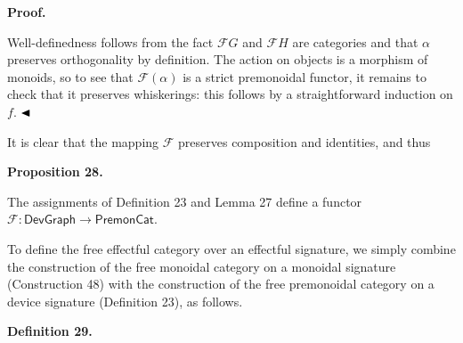\documentclass[10pt,a4paper]{article}
\begin{document}
 
\par\medskip\noindent\textbf{Proof.}\par
 
 
Well-definedness follows from the fact $\mathcal{F}G$ and $\mathcal{F}H$ are categories and that $\alpha$ preserves orthogonality by definition. The action on objects is a morphism of monoids, so to see that $\mathcal{F}(\alpha)$ is a strict premonoidal functor, it remains to check that it preserves whiskerings: this follows by a straightforward induction on $f$. $\hfill\blacktriangleleft$\par
 
 
 
It is clear that the mapping $\mathcal{F}$ preserves composition and identities, and thus\par
 
 
 
\par\medskip\noindent\textbf{Proposition 28.}\par
 
 
The assignments of Definition 23 and Lemma 27 define a functor $\mathcal{F}:\mathsf{DevGraph}\to\mathsf{PremonCat}$.\par
 
 
 
 
To define the free effectful category over an effectful signature, we simply combine the construction of the free monoidal category on a monoidal signature (Construction 48) with the construction of the free premonoidal category on a device signature (Definition 23), as follows.\par
 
 
 
\par\medskip\noindent\textbf{Definition 29.}\par
 
 
\end{document}
